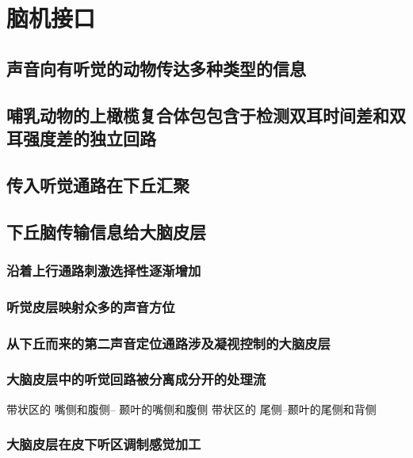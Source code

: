 \chapter{脑机接口}

\section{声音向有听觉的动物传达多种类型的信息}

\section{哺乳动物的上橄榄复合体包包含于检测双耳时间差和双耳强度差的独立回路}

\section{传入听觉通路在下丘汇聚}


\section{下丘脑传输信息给大脑皮层}

\subsection{沿着上行通路刺激选择性逐渐增加}

\subsection{听觉皮层映射众多的声音方位}

\subsection{从下丘而来的第二声音定位通路涉及凝视控制的大脑皮层}


\subsection{大脑皮层中的听觉回路被分离成分开的处理流}
带状区的 嘴侧和腹侧-- 颞叶的嘴侧和腹侧
带状区的 尾侧--颞叶的尾侧和背侧

\subsection{大脑皮层在皮下听区调制感觉加工}


